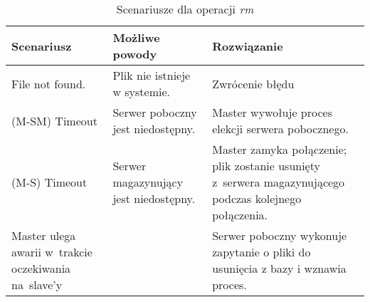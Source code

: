 \makeatletter
\setlength{\@fptop}{0pt}
\makeatother
\begin{table}[h]
	\begin{tabular}{|p{4cm} | p{4cm} | p{6cm} |}
		\hline
		\textbf{Scenariusz} & \textbf{Możliwe powody} &	\textbf{Rozwiązanie}	\\	\hline
		File not found. & Plik nie istnieje w systemie. & Zwrócenie błędu \\ \hline
		(M-SM) Timeout & Serwer poboczny jest niedostępny. & Master wywołuje proces
		elekcji serwera pobocznego. \\ \hline
		(M-S) Timeout & Serwer magazynujący jest niedostępny. & Master zamyka
		połączenie; plik zostanie usunięty z~serwera magazynującego podczas kolejnego
		połączenia. \\ \hline
		Master ulega awarii w~trakcie oczekiwania na~slave’y & & Serwer poboczny
		wykonuje zapytanie o pliki do usunięcia z bazy i wznawia proces. \\ \hline
	\end{tabular}
\caption{Scenariusze dla operacji \emph{rm}}
\end{table}